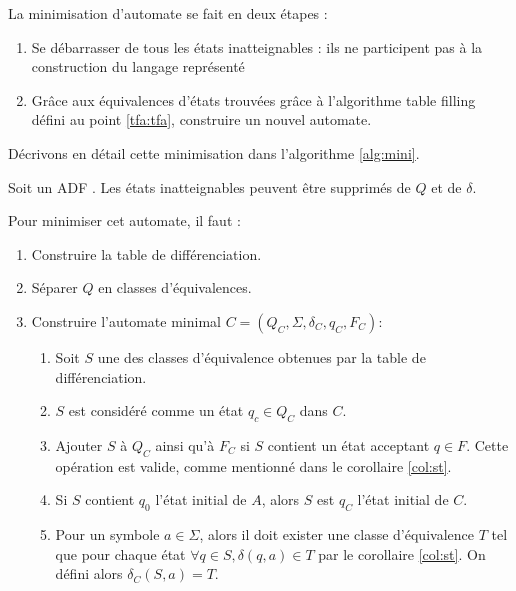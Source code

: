 La minimisation d'automate se fait en deux étapes :
\begin{enumerate}
 \item Se débarrasser de tous les états inatteignables : ils ne participent pas à la construction du langage représenté
 \item Grâce aux équivalences d'états trouvées grâce à l'algorithme table filling défini au point \ref{tfa:tfa}, construire un nouvel automate.
\end{enumerate}

Décrivons en détail cette minimisation dans l'algorithme \ref{alg:mini}.

\begin{algo}[Minimisation]\label{alg:mini}
Soit un ADF \automaton. Les états inatteignables peuvent être supprimés de $Q$ et de $\delta$.

Pour minimiser cet automate, il faut :
\begin{enumerate}
 \item Construire la table de différenciation.
 \item Séparer $Q$ en classes d'équivalences.
 \item Construire l'automate minimal $C=(Q_C,\Sigma, \delta_C, q_C, F_C)$:
 \begin{enumerate}
	 \item Soit $S$ une des classes d'équivalence obtenues par la table de différenciation.
   \item $S$ est considéré comme un état $q_c \in Q_C$ dans $C$.
	 \item Ajouter $S$ à $Q_C$ ainsi qu'à $F_C$ si $S$ contient un état acceptant $q\in F$. Cette opération est valide, comme mentionné dans le corollaire \ref{col:st}.
	 \item Si $S$ contient $q_0$ l'état initial de $A$, alors $S$ est $q_C$ l'état initial de $C$.
	 \item Pour un symbole $a \in \Sigma$, alors il doit exister une classe d'équivalence $T$ tel que pour chaque état $\forall q \in S,\delta(q,a) \in T$ par le corollaire \ref{col:st}. On défini alors $\delta_C(S,a)=T$.
 \end{enumerate}
\end{enumerate}
\end{algo}

